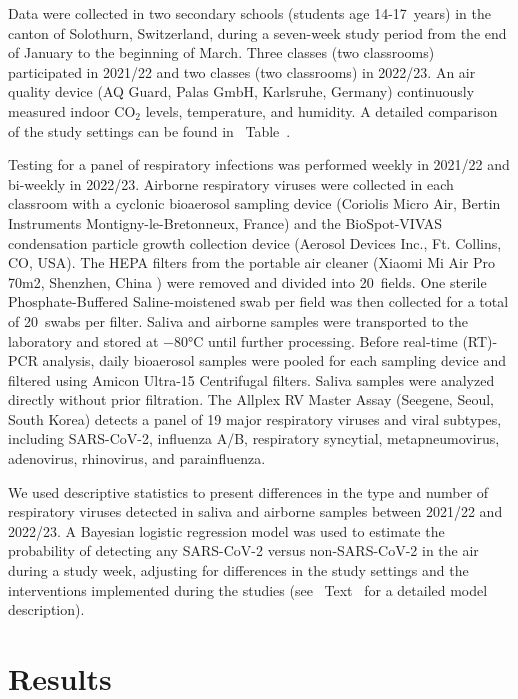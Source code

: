 \documentclass[fleqn,11pt]{wlscirep}
\begin{document}
Data were collected in two secondary schools (students age 14-17~years) in the canton of Solothurn, Switzerland, during a seven-week study period from the end of January to the beginning of March. Three classes (two classrooms) participated in 2021/22 and two classes (two classrooms) in 2022/23. An air quality device (AQ Guard, Palas GmbH, Karlsruhe, Germany) continuously measured indoor CO$_2$ levels, temperature, and humidity. A detailed comparison of the study settings can be found in \supp~Table~. 

Testing for a panel of respiratory infections was performed weekly in 2021/22 and bi-weekly in 2022/23. Airborne respiratory viruses were collected in each classroom with a cyclonic bioaerosol sampling device (Coriolis Micro Air, Bertin Instruments Montigny-le-Bretonneux, France) and the BioSpot-VIVAS condensation particle growth collection device (Aerosol Devices Inc., Ft. Collins, CO, USA)\cite{Lednicky2016AST}. The HEPA filters from the portable air cleaner (Xiaomi Mi Air Pro 70m2, Shenzhen, China ) were removed and divided into 20~fields. One sterile Phosphate-Buffered Saline-moistened swab per field was then collected for a total of 20~swabs per filter. Saliva and airborne samples were transported to the laboratory and stored at $-$80°C until further processing\cite{Huber2021}. Before real-time (RT)-PCR analysis, daily bioaerosol samples were pooled for each sampling device and filtered using Amicon Ultra-15 Centrifugal filters\cite{Banholzer2023PLoSMed}. Saliva samples were analyzed directly without prior filtration. The Allplex RV Master Assay (Seegene, Seoul, South Korea) detects a panel of 19 major respiratory viruses and viral subtypes, including SARS-CoV-2, influenza A/B, respiratory syncytial, metapneumovirus, adenovirus, rhinovirus, and parainfluenza. 

We used descriptive statistics to present differences in the type and number of respiratory viruses detected in saliva and airborne samples between 2021/22 and 2022/23. A Bayesian logistic regression model was used to estimate the probability of detecting any SARS-CoV-2 versus non-SARS-CoV-2 in the air during a study week, adjusting for differences in the study settings and the interventions implemented during the studies (see \supp~Text~ for a detailed model description).   

\section*{Results}
\end{document}
